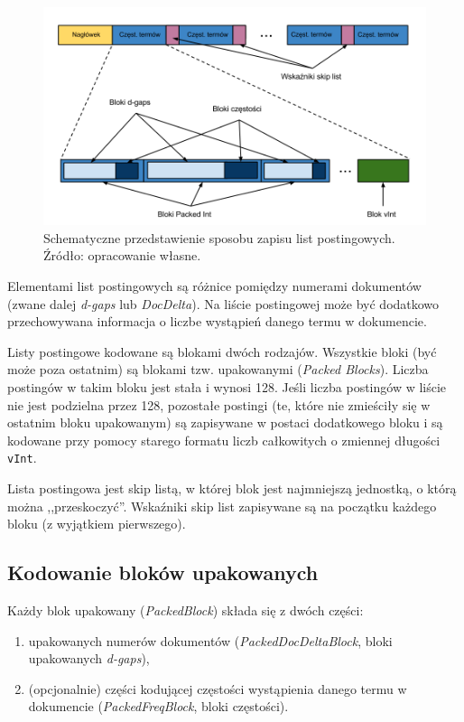 \begin{figure}[here]
 \includegraphics[scale=0.37]{pictures/PostingCodingFormat.png}
 \caption{Schematyczne przedstawienie sposobu zapisu list postingowych. Źródło: opracowanie własne. \label{fig:postingCodingFormat}}
\end{figure}

Elementami list postingowych są różnice pomiędzy numerami dokumentów (zwane dalej \emph{d-gaps} lub \emph{DocDelta}). Na liście postingowej może być dodatkowo przechowywana informacja o liczbe wystąpień danego termu w dokumencie.

Listy postingowe kodowane są blokami dwóch rodzajów. Wszystkie bloki (być może poza ostatnim) są blokami tzw. upakowanymi (\emph{Packed Blocks}). Liczba postingów w takim bloku jest stała i wynosi 128. Jeśli liczba postingów w liście nie jest podzielna przez 128, pozostałe postingi (te, które nie zmieściły się w ostatnim bloku upakowanym) są zapisywane w postaci dodatkowego bloku i są kodowane przy pomocy starego formatu liczb całkowitych o zmiennej długości \texttt{vInt}.

Lista postingowa jest skip listą, w której blok jest najmniejszą jednostką, o którą można ,,przeskoczyć''. Wskaźniki skip list zapisywane są na początku każdego bloku (z wyjątkiem pierwszego).

\subsection{Kodowanie bloków upakowanych}
\label{sec:packedBlockEncoding}

Każdy blok upakowany (\emph{PackedBlock}) składa się z dwóch części: 
\begin{enumerate}
 \item upakowanych numerów dokumentów (\emph{PackedDocDeltaBlock}, bloki upakowanych \emph{d-gaps}),
 \item (opcjonalnie) części kodującej częstości wystąpienia danego termu w dokumencie (\emph{PackedFreqBlock}, bloki częstości).
\end{enumerate}

